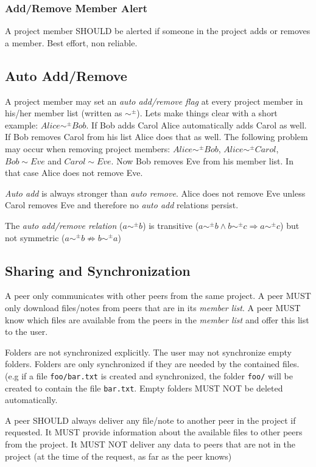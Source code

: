 \subsubsection{Add/Remove Member Alert}
A project member SHOULD be alerted if someone in the project adds or removes a member. Best effort, non reliable. 

\subsection{Auto Add/Remove}
A project member may set an \emph{auto add/remove flag} at every project member in his/her member list (written as $\sim ^\pm$). Lets make things clear with a short example: $Alice \sim ^\pm Bob$. If Bob adds Carol Alice automatically adds Carol as well. If Bob removes Carol from his list Alice does that as well. The following problem may occur when removing project members: $Alice \sim ^\pm Bob$, $Alice \sim ^\pm  Carol$, $Bob \sim Eve$ and $Carol \sim Eve$. Now Bob removes Eve from his member list. In that case Alice does not remove Eve. 

\emph{Auto add} is always stronger than \emph{auto remove}. Alice does not remove Eve unless Carol removes Eve and therefore no \emph{auto add} relations persist. 

The \emph{auto add/remove relation} ($a \sim ^\pm b$) is transitive ($a \sim ^\pm b \wedge b\sim ^\pm c \Rightarrow a \sim ^\pm c$) but not symmetric ($a \sim ^\pm b \not\Rightarrow b \sim ^\pm a$)

\subsection{Sharing and Synchronization}
A peer only communicates with other peers from the same project. A peer MUST only download files/notes from peers that are in its \emph{member list}. A peer MUST know which files are available from the peers in the \emph{member list} and offer this list to the user.

Folders are not synchronized explicitly. The user may not synchronize empty folders. Folders are only synchronized if they are needed by the contained files. (e.g if a file \texttt{foo/bar.txt} is created and synchronized, the folder \texttt{foo/} will be created to contain the file \texttt{bar.txt}. Empty folders MUST NOT be deleted automatically. 

A peer SHOULD always deliver any file/note to another peer in the project if requested. It MUST provide information about the available files to other peers from the project. It MUST NOT deliver any data to peers that are not in the project (at the time of the request, as far as the peer knows)

